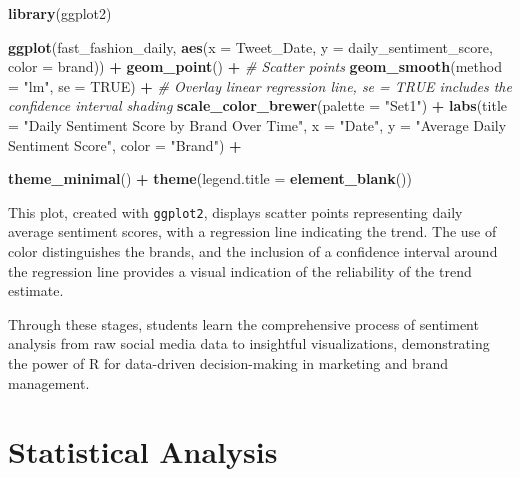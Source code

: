 \documentclass[
]{book}
\newenvironment{Shaded}{\begin{snugshade}}{\end{snugshade}}
\newcommand{\AttributeTok}[1]{\textcolor[rgb]{0.13,0.29,0.53}{#1}}
\newcommand{\CommentTok}[1]{\textcolor[rgb]{0.56,0.35,0.01}{\textit{#1}}}
\newcommand{\ConstantTok}[1]{\textcolor[rgb]{0.56,0.35,0.01}{#1}}
\newcommand{\FunctionTok}[1]{\textcolor[rgb]{0.13,0.29,0.53}{\textbf{#1}}}
\newcommand{\NormalTok}[1]{#1}
\newcommand{\SpecialCharTok}[1]{\textcolor[rgb]{0.81,0.36,0.00}{\textbf{#1}}}
\newcommand{\StringTok}[1]{\textcolor[rgb]{0.31,0.60,0.02}{#1}}
\begin{document}
\begin{Shaded}
\begin{Highlighting}[]
\FunctionTok{library}\NormalTok{(ggplot2)}

\FunctionTok{ggplot}\NormalTok{(fast\_fashion\_daily, }\FunctionTok{aes}\NormalTok{(}\AttributeTok{x =}\NormalTok{ Tweet\_Date, }\AttributeTok{y =}\NormalTok{ daily\_sentiment\_score, }\AttributeTok{color =}\NormalTok{ brand)) }\SpecialCharTok{+}
  \FunctionTok{geom\_point}\NormalTok{() }\SpecialCharTok{+}  \CommentTok{\# Scatter points}
  \FunctionTok{geom\_smooth}\NormalTok{(}\AttributeTok{method =} \StringTok{"lm"}\NormalTok{, }\AttributeTok{se =} \ConstantTok{TRUE}\NormalTok{) }\SpecialCharTok{+}  \CommentTok{\# Overlay linear regression line, se = TRUE includes the confidence interval shading}
  \FunctionTok{scale\_color\_brewer}\NormalTok{(}\AttributeTok{palette =} \StringTok{"Set1"}\NormalTok{) }\SpecialCharTok{+}
  \FunctionTok{labs}\NormalTok{(}\AttributeTok{title =} \StringTok{"Daily Sentiment Score by Brand Over Time"}\NormalTok{,}
       \AttributeTok{x =} \StringTok{"Date"}\NormalTok{,}
       \AttributeTok{y =} \StringTok{"Average Daily Sentiment Score"}\NormalTok{,}
       \AttributeTok{color =} \StringTok{"Brand"}\NormalTok{) }\SpecialCharTok{+}
 

 \FunctionTok{theme\_minimal}\NormalTok{() }\SpecialCharTok{+}
  \FunctionTok{theme}\NormalTok{(}\AttributeTok{legend.title =} \FunctionTok{element\_blank}\NormalTok{())}
\end{Highlighting}
\end{Shaded}

This plot, created with \texttt{ggplot2}, displays scatter points representing daily average sentiment scores, with a regression line indicating the trend. The use of color distinguishes the brands, and the inclusion of a confidence interval around the regression line provides a visual indication of the reliability of the trend estimate.

Through these stages, students learn the comprehensive process of sentiment analysis from raw social media data to insightful visualizations, demonstrating the power of R for data-driven decision-making in marketing and brand management.

\hypertarget{statistical-analysis}{%
\chapter{Statistical Analysis}\label{statistical-analysis}}
\end{document}
